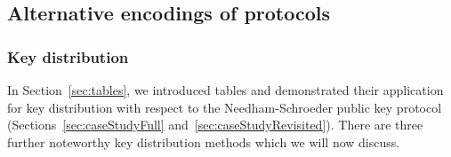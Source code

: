 \documentclass{book}
\begin{document}
\subsection{Alternative encodings of protocols}\label{sec:alternativeEncodings}


\subsubsection{Key distribution}

In Section~\ref{sec:tables}, we introduced tables and demonstrated their application for key distribution with respect to the Needham-Schroeder public key protocol (Sections~\ref{sec:caseStudyFull} and~\ref{sec:caseStudyRevisited}). There are three further noteworthy key distribution methods which we will now discuss.
\end{document}
